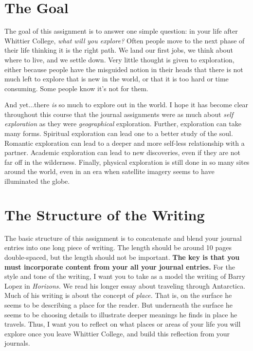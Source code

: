 \documentclass[10pt]{article}
\begin{document}
\maketitle

\section{The Goal}
The goal of this assignment is to answer one simple question: in your life after Whittier College, \textit{what will you explore?}  Often people move to the next phase of their life thinking it is the right path.  We land our first jobs, we think about where to live, and we settle down.  Very little thought is given to exploration, either because people have the misguided notion in their heads that there is not much left to explore that is new in the world, or that it is too hard or time consuming.  Some people know it's not for them.

And yet...there \textit{is} so much to explore out in the world.  I hope it has become clear throughout this course that the journal assignments were as much about \textit{self exploration} as they were \textit{geographical} exploration.  Further, exploration can take many forms.  Spiritual exploration can lead one to a better study of the soul.  Romantic exploration can lead to a deeper and more self-less relationship with a partner.  Academic exploration can lead to new discoveries, even if they are not far off in the wilderness.  Finally, physical exploration is still done in so many sites around the world, even in an era when satellite imagery seems to have illuminated the globe.

\section{The Structure of the Writing}
The basic structure of this assignment is to concatenate and blend your journal entries into one long piece of writing.  The length should be around 10 pages double-spaced, but the length should not be important.  \textbf{The key is that you must incorporate content from your all your journal entries.}  For the style and tone of the writing, I want you to take as a model the writing of Barry Lopez in \textit{Horizons.}  We read his longer essay about traveling through Antarctica.  Much of his writing is about the concept of \textit{place.}  That is, on the surface he seems to be describing a place for the reader.  But underneath the surface he seems to be choosing details to illustrate deeper meanings he finds in place he travels.  Thus, I want you to reflect on what places or areas of your life you will explore once you leave Whittier College, and build this reflection from your journals.
\end{document}
